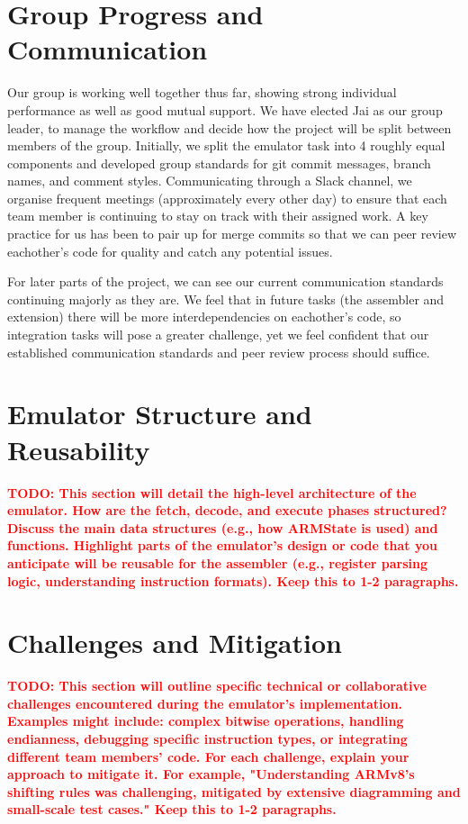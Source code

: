 \documentclass[11pt,a4paper]{article} %
\newcommand{\todo}[1]{\textcolor{red}{\textbf{TODO: #1}}}
\begin{document}
\section{Group Progress and Communication}
\label{sec:group-progress}

Our group is working well together thus far, showing strong individual performance as well as good mutual support. We have elected Jai as our group leader, to manage the workflow and decide how the project will be split between members of the group. Initially, we split the emulator task into 4 roughly equal components and developed group standards for git commit messages, branch names, and comment styles. Communicating through a Slack channel, we organise frequent meetings (approximately every other day) to ensure that each team member is continuing to stay on track with their assigned work. A key practice for us has been to pair up for merge commits so that we can peer review eachother’s code for quality and catch any potential issues. 

For later parts of the project, we can see our current communication standards continuing majorly as they are. We feel that in future tasks (the assembler and extension) there will be more interdependencies on eachother’s code, so integration tasks will pose a greater challenge, yet we feel confident that our established communication standards and peer review process should suffice.

\section{Emulator Structure and Reusability}
\label{sec:emulator-structure}
\todo{This section will detail the high-level architecture of the emulator. How are the fetch, decode, and execute phases structured? Discuss the main data structures (e.g., how ARMState is used) and functions. Highlight parts of the emulator's design or code that you anticipate will be reusable for the assembler (e.g., register parsing logic, understanding instruction formats). Keep this to 1-2 paragraphs.}

\section{Challenges and Mitigation}
\label{sec:challenges}
\todo{This section will outline specific technical or collaborative challenges encountered during the emulator's implementation. Examples might include: complex bitwise operations, handling endianness, debugging specific instruction types, or integrating different team members' code. For each challenge, explain your approach to mitigate it. For example, "Understanding ARMv8's shifting rules was challenging, mitigated by extensive diagramming and small-scale test cases." Keep this to 1-2 paragraphs.}
\end{document}
